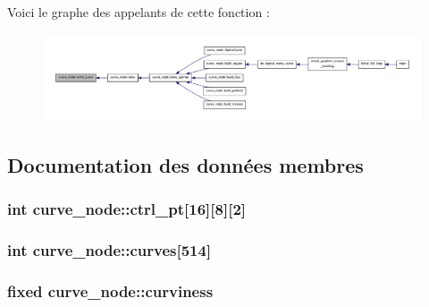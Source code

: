 Voici le graphe des appelants de cette fonction \+:
\nopagebreak
\begin{figure}[H]
\begin{center}
\leavevmode
\includegraphics[width=350pt]{classcurve__node_abc1a06d649c6dce22334da762f2955b8_icgraph}
\end{center}
\end{figure}




\subsection{Documentation des données membres}
\hypertarget{classcurve__node_ab7280e17d47152797e10e5992791ee9b}{
\subsubsection[{ctrl\+\_\+pt}]{\setlength{\rightskip}{0pt plus 5cm}int curve\+\_\+node\+::ctrl\+\_\+pt\mbox{[}16\mbox{]}\mbox{[}8\mbox{]}\mbox{[}2\mbox{]}\hspace{0.3cm}{\ttfamily [static]}}}\label{classcurve__node_ab7280e17d47152797e10e5992791ee9b}
\hypertarget{classcurve__node_a0aebfec8e10d7fc02442cd5326433c93}{
\subsubsection[{curves}]{\setlength{\rightskip}{0pt plus 5cm}int curve\+\_\+node\+::curves\mbox{[}514\mbox{]}\hspace{0.3cm}{\ttfamily [static]}}}\label{classcurve__node_a0aebfec8e10d7fc02442cd5326433c93}
\hypertarget{classcurve__node_a46e1f23c6d19a1ca915697c80ed72a84}{
\subsubsection[{curviness}]{\setlength{\rightskip}{0pt plus 5cm}fixed curve\+\_\+node\+::curviness\hspace{0.3cm}{\ttfamily [static]}}}\label{classcurve__node_a46e1f23c6d19a1ca915697c80ed72a84}
